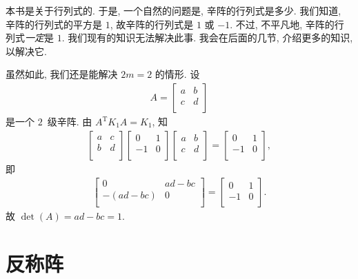 本书是关于行列式的.
于是, 一个自然的问题是, 辛阵的行列式是多少.
我们知道, 辛阵的行列式的平方是 \(1\),
故辛阵的行列式是 \(1\) 或 \(-1\).
不过, 不平凡地, 辛阵的行列式\emph{一定}是 \(1\).
我们现有的知识无法解决此事.
我会在后面的几节, 介绍更多的知识, 以解决它.

虽然如此, 我们还是能解决 \(2m = 2\) 的情形.
设
\begin{align*}
    A = \begin{bmatrix}
            a & b \\
            c & d \\
        \end{bmatrix}
\end{align*}
是一个 \(2\)~级辛阵.
由 \(A^{\mathrm{T}} K_1 A = K_1\), 知
\begin{align*}
    \begin{bmatrix}
        a & c \\
        b & d \\
    \end{bmatrix}
    \begin{bmatrix}
        0  & 1 \\
        -1 & 0 \\
    \end{bmatrix}
    \begin{bmatrix}
        a & b \\
        c & d \\
    \end{bmatrix}
    =
    \begin{bmatrix}
        0  & 1 \\
        -1 & 0 \\
    \end{bmatrix},
\end{align*}
即
\begin{align*}
    \begin{bmatrix}
        0          & ad - bc \\
        -(ad - bc) & 0       \\
    \end{bmatrix}
    =
    \begin{bmatrix}
        0  & 1 \\
        -1 & 0 \\
    \end{bmatrix}.
\end{align*}
故
\(\det {(A)} = ad - bc = 1\).

\section{反称阵}

